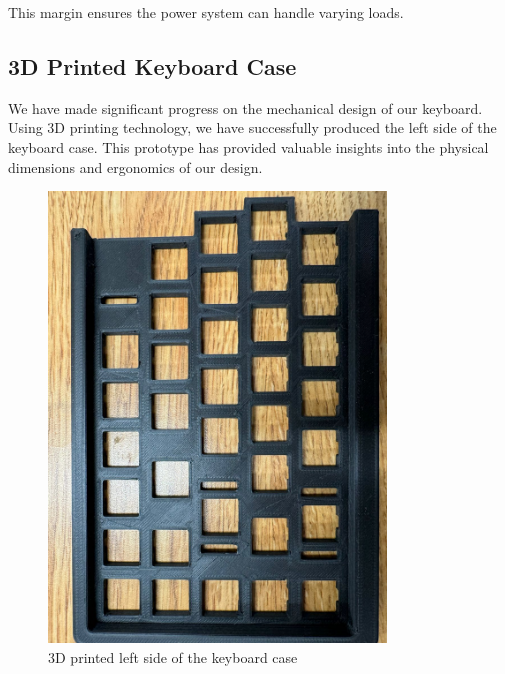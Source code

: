 \documentclass[a4paper,11pt]{article}%
\begin{document}
This margin ensures the power system can handle varying loads.


\subsection{3D Printed Keyboard Case}

We have made significant progress on the mechanical design of our keyboard. Using 3D printing technology, we have successfully produced the left side of the keyboard case. This prototype has provided valuable insights into the physical dimensions and ergonomics of our design.

\begin{figure}[H]
    \centering
    \includegraphics[width=0.8\textwidth]{figures/Update_4/3d1}
    \caption{3D printed left side of the keyboard case}
\end{figure}
\end{document}
